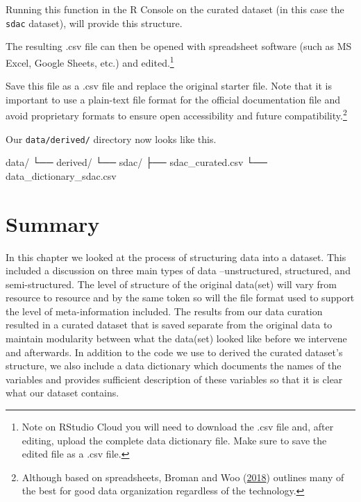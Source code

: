 \documentclass[
  letterpaper,
  DIV=11,
  numbers=noendperiod]{scrreport}
\newenvironment{Shaded}{\begin{snugshade}}{\end{snugshade}}
\newcommand{\ExtensionTok}[1]{\textcolor[rgb]{0.00,0.00,0.00}{#1}}
\newcommand{\NormalTok}[1]{\textcolor[rgb]{0.00,0.00,0.00}{#1}}
\theoremstyle{definition}
\theoremstyle{remark}
\begin{document}
Running this function in the R Console on the curated dataset (in this
case the \texttt{sdac} dataset), will provide this structure.

\begin{table}

\end{table}

The resulting .csv file can then be opened with spreadsheet software
(such as MS Excel, Google Sheets, etc.) and edited.\footnote{Note on
  RStudio Cloud you will need to download the .csv file and, after
  editing, upload the complete data dictionary file. Make sure to save
  the edited file as a .csv file.}

Save this file as a .csv file and replace the original starter file.
Note that it is important to use a plain-text file format for the
official documentation file and avoid proprietary formats to ensure open
accessibility and future compatibility.\footnote{Although based on
  spreadsheets, Broman and Woo
  (\protect\hyperlink{ref-Broman2018}{2018}) outlines many of the best
  for good data organization regardless of the technology.}

Our \texttt{data/derived/} directory now looks like this.

\begin{Shaded}
\begin{Highlighting}[]
\ExtensionTok{data/}
\ExtensionTok{└──}\NormalTok{ derived/}
    \ExtensionTok{└──}\NormalTok{ sdac/}
        \ExtensionTok{├──}\NormalTok{ sdac\_curated.csv}
        \ExtensionTok{└──}\NormalTok{ data\_dictionary\_sdac.csv}
\end{Highlighting}
\end{Shaded}

\hypertarget{summary-8}{%
\section*{Summary}\label{summary-8}}


In this chapter we looked at the process of structuring data into a
dataset. This included a discussion on three main types of data
--unstructured, structured, and semi-structured. The level of structure
of the original data(set) will vary from resource to resource and by the
same token so will the file format used to support the level of
meta-information included. The results from our data curation resulted
in a curated dataset that is saved separate from the original data to
maintain modularity between what the data(set) looked like before we
intervene and afterwards. In addition to the code we use to derived the
curated dataset's structure, we also include a data dictionary which
documents the names of the variables and provides sufficient description
of these variables so that it is clear what our dataset contains.
\end{document}
